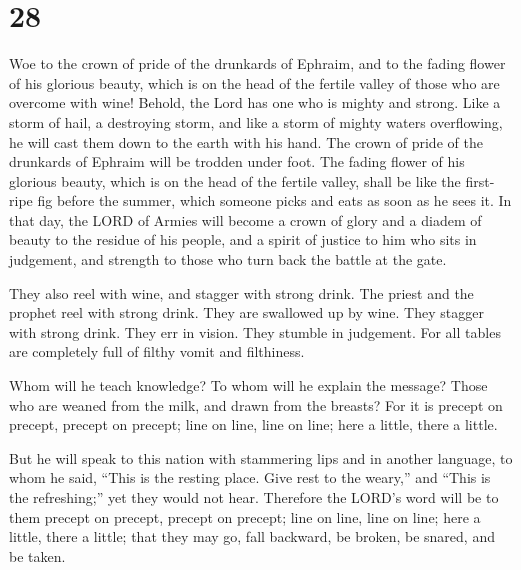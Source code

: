 \hypertarget{section-27}{%
\section{28}\label{section-27}}

 Woe to the crown of pride of the drunkards of Ephraim,
and to the fading flower of his glorious beauty, which is on the head of
the fertile valley of those who are overcome with wine! 
Behold, the Lord has one who is mighty and strong. Like a storm of hail,
a destroying storm, and like a storm of mighty waters overflowing, he
will cast them down to the earth with his hand.  The crown
of pride of the drunkards of Ephraim will be trodden under foot.
 The fading flower of his glorious beauty, which is on the
head of the fertile valley, shall be like the first-ripe fig before the
summer, which someone picks and eats as soon as he sees it.
 In that day, the LORD of Armies will become a crown of
glory and a diadem of beauty to the residue of his people,
 and a spirit of justice to him who sits in judgement, and
strength to those who turn back the battle at the gate.

 They also reel with wine, and stagger with strong drink.
The priest and the prophet reel with strong drink. They are swallowed up
by wine. They stagger with strong drink. They err in vision. They
stumble in judgement.  For all tables are completely full
of filthy vomit and filthiness.

 Whom will he teach knowledge? To whom will he explain the
message? Those who are weaned from the milk, and drawn from the breasts?
 For it is precept on precept, precept on precept; line
on line, line on line; here a little, there a little.

 But he will speak to this nation with stammering lips
and in another language,  to whom he said, ``This is the
resting place. Give rest to the weary,'' and ``This is the refreshing;''
yet they would not hear.  Therefore the LORD's word will
be to them precept on precept, precept on precept; line on line, line on
line; here a little, there a little; that they may go, fall backward, be
broken, be snared, and be taken.

